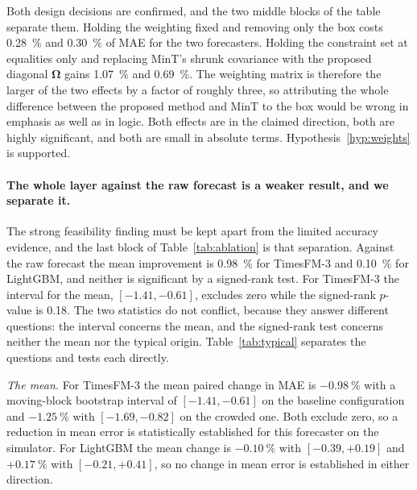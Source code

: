\documentclass[utf8]{FrontiersinHarvard}
\newif\ifrevisionmarkup
\newcommand{\new}[1]{\ifrevisionmarkup\textcolor{revision}{#1}\else#1\fi}
\newif\ifsecondrevisionmarkup
\newcommand{\rev}[1]{\ifsecondrevisionmarkup\textcolor{revisiontwo}{#1}\else#1\fi}
\theoremstyle{plain}
\theoremstyle{definition}
\theoremstyle{remark}
\newcommand{\bOm}{\bm{\Omega}}
\begin{document}
\new{Both design decisions are confirmed, \rev{and the two middle blocks of the table separate them.} Holding the weighting fixed and removing only the box costs \SI{0.28}{\percent} and \SI{0.30}{\percent} of MAE for the two forecasters. Holding the constraint set at equalities only and replacing MinT's shrunk covariance with the proposed diagonal $\bOm$ gains \SI{1.07}{\percent} and \SI{0.69}{\percent}. The weighting matrix is therefore the larger of the two effects by a factor of roughly three, \rev{so attributing the whole difference between the proposed method and MinT to the box would be wrong in emphasis as well as in logic}. Both effects are in the claimed direction, both are highly significant, and both are small in absolute terms. Hypothesis~\ref{hyp:weights} is supported.}

\new{\paragraph{The whole layer against the raw forecast is a weaker result, and we separate it.} \rev{The strong feasibility finding must be kept apart from the limited accuracy evidence, and the last block of Table~\ref{tab:ablation} is that separation.} Against the raw forecast the mean improvement is \SI{0.98}{\percent} for TimesFM-3 and \SI{0.10}{\percent} for LightGBM, and neither is significant by a signed-rank test. \rev{For TimesFM-3 the interval for the mean, $[-1.41,-0.61]$, excludes zero while the signed-rank $p$-value is \num{0.18}. The two statistics do not conflict, because they answer different questions: the interval concerns the mean, and the signed-rank test concerns neither the mean nor the typical origin. Table~\ref{tab:typical} separates the questions and tests each directly.}}

\rev{\emph{The mean.} For TimesFM-3 the mean paired change in MAE is $-\SI{0.98}{\percent}$ with a moving-block bootstrap interval of $[-1.41,-0.61]$ on the baseline configuration and $-\SI{1.25}{\percent}$ with $[-1.69,-0.82]$ on the crowded one. Both exclude zero, so a reduction in mean error is statistically established for this forecaster on the simulator. For LightGBM the mean change is $-\SI{0.10}{\percent}$ with $[-0.39,+0.19]$ and $+\SI{0.17}{\percent}$ with $[-0.21,+0.41]$, so no change in mean error is established in either direction.}
\end{document}
